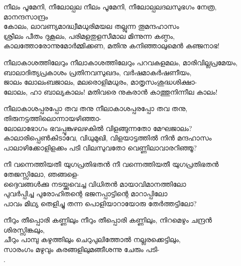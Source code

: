 \begin{enumerate}

\begin{slokam}{\VSr}{\VKG}{നീലം പൂമേനി, നീലോല്പല}
നീലം പൂമേനി, നീലോല്പലദലസുഭഗം നേത്ര, മാനന്ദസാന്ദ്രം \\
കോലം, ലാവണ്യമാദ്ധ്വീമധുരിമയല തല്ലുന്ന തൂമന്ദഹാസം \\
ശ്രീലം പീതം ദുകൂലം, പരിമളതുളസീമാല മിന്നുന്ന കണ്ഠം, \\
കാലത്തോരോന്നുമോർമ്മിക്കണ, മതിനു കനിഞ്ഞാലുമെൻ കഞ്ജനാഭ! 
\end{slokam}


\begin{slokam}{\VSr}{\KJ}{നീലാകാശത്തിലേറും}
നീലാകാശത്തിലേറും പറവകളമലം, മാരിവില്ലപ്രമേയം,\\
ബാലാദിത്യപ്രകാശം പ്രതിനവസുഖദം, വർഷമാകർഷണീയം,\\
ജാലം ലോലംബജാലം, മലരൊളിമധുരം, മാതൃസംശുദ്ധശിക്ഷാ-\\
ലോലം, ഹാ ബാല്യകാലം! മതിവരെ നുകരാൻ കാത്തുനിന്നീല കാലം!
\end{slokam}



\begin{slokam}{\VSr}{\Unk}{നീലാകാശപ്പരപ്പോ തവ തനു}
നീലാകാശപ്പരപ്പോ തവ തനു, തിരുനട്ടത്തിലൊന്നായഴിഞ്ഞാ-\\
ലോലാഭോഗം ഭവപ്പൂങ്കുഴലഴകിൽ വിളങ്ങുന്നതോ മേഘജാലം?\\
കാലാരിപ്പെൺകിടാവേ, വിധുമുഖി, വിളയാട്ടത്തിൽ നിൻ മന്ദഹാസം\\
പാലാഴിക്കോളിളക്കം പടി വിലസുവതോ വെണ്ണിലാവാരറിഞ്ഞൂ?
\end{slokam}



\begin{slokam}{\VSv}{\VRV}{നീ വന്നെത്തിയതീ യുഗപ്രതിഭതൻ}
നീ വന്നെത്തിയതീ യുഗപ്രതിഭതൻ തേജസ്സിലോ, ഞങ്ങളെ-\\
ദ്ദൈവങ്ങള്‍ക്കു നടയ്ക്കുവെച്ച വിധിതൻ മായാവിമാനത്തിലോ\\
പുവർപ്പിച്ച പുരോഹിതന്റെ ഭജനപ്പാട്ടിന്റെ മാറാപ്പിലോ\\
പാവം മിഥ്യ തെളിച്ചു തന്ന പൊളിയാറായോരു തേർത്തട്ടിലോ?
\end{slokam}




\begin{slokam}{\VSv}{\Unk}{നീറും തീപ്പൊരി കണ്ണിലും}
നീറും തീപ്പൊരി കണ്ണിലും, നിറമെഴും ചന്ദ്രൻ ശിരസ്സിങ്കലും,\\
ചീറും പാമ്പു കഴുത്തിലും ചെറുപുലിത്തോൽ നല്ലരക്കെട്ടിലും,\\
സാരംഗം മഴുവും കരങ്ങളിലുമങ്ങീശന്നു ചേരും പടി-\\
.
\end{slokam}


\end{enumerate}
